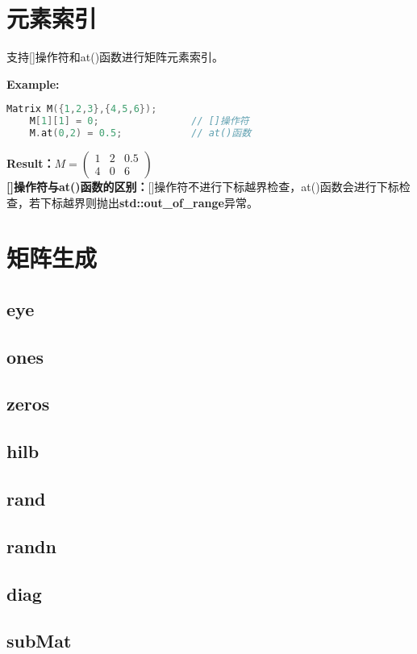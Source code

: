 \documentclass[UTF8]{ctexart}
\begin{document}
\section{元素索引}
支持[]操作符和at()函数进行矩阵元素索引。

\textbf{Example:}
{
    \setmainfont{Consolas}
    \begin{lstlisting}[language=C++]
    Matrix M({1,2,3},{4,5,6});
    M[1][1] = 0;                // []操作符
    M.at(0,2) = 0.5;            // at()函数
    \end{lstlisting}
}

\textbf{Result：}$M = \left( \begin{matrix} 1 & 2 & 0.5 \\ 4 & 0 & 6 \end{matrix} \right) $\\

\textbf{[]操作符与at()函数的区别：}[]操作符不进行下标越界检查，at()函数会进行下标检查，若下标越界则抛出\textbf{std::out\_of\_range}异常。

\section{矩阵生成}
\subsection{eye}
\subsection{ones}
\subsection{zeros}
\subsection{hilb}
\subsection{rand}
\subsection{randn}
\subsection{diag}
\subsection{subMat}
\end{document}
